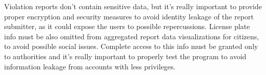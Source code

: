 Violation reports don't contain sensitive data, but it's really important to provide proper encryption and security measures to avoid identity leakage of the report submitter, as it could expose the users to possible repercussions. License plate info must be also omitted from aggregated report data visualizations for citizens, to  avoid possible social issues. Complete access to this info must be granted only to authorities and it's really important to properly test the program to avoid information leakage from accounts with less privileges.
